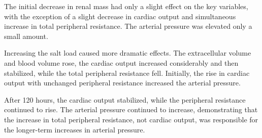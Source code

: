 The initial decrease in renal mass had only a slight effect on the key variables, with the exception of a slight decrease in cardiac output and simultaneous increase in total peripheral resistance. The arterial pressure was elevated only a small amount.

Increasing the salt load caused more dramatic effects. The extracellular volume and blood volume rose, the cardiac output increased considerably and then stabilized, while the total peripheral resistance fell. Initially, the rise in cardiac output with unchanged peripheral resistance increased the arterial pressure.

After 120 hours, the cardiac output stabilized, while the peripheral resistance continued to rise. The arterial pressure continued to increase, demonstrating that the increase in total peripheral resistance, not cardiac output, was responsible for the longer-term increases in arterial pressure.
